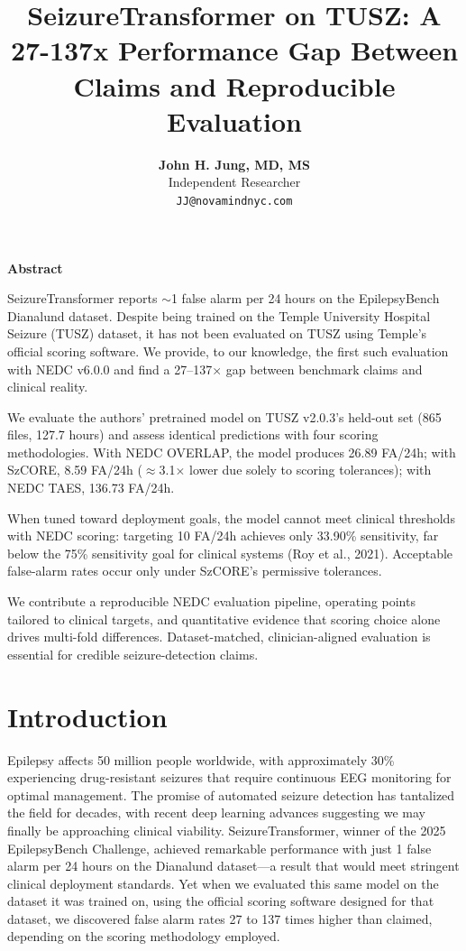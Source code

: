 \documentclass[10pt]{article}
\title{SeizureTransformer on TUSZ: A 27-137x Performance Gap Between\\Claims and Reproducible Evaluation}
\author{
  \textbf{John H. Jung, MD, MS}\\
  Independent Researcher\\
  \texttt{JJ@novamindnyc.com}
}
\date{}  %
\begin{document}
\maketitle

\begin{center}
\textbf{Abstract}
\end{center}

SeizureTransformer reports $\sim$1 false alarm per 24 hours on the EpilepsyBench Dianalund dataset. Despite being trained on the Temple University Hospital Seizure (TUSZ) dataset, it has not been evaluated on TUSZ using Temple's official scoring software. We provide, to our knowledge, the first such evaluation with NEDC v6.0.0 and find a 27--137$\times$ gap between benchmark claims and clinical reality.

We evaluate the authors' pretrained model on TUSZ v2.0.3's held-out set (865 files, 127.7 hours) and assess identical predictions with four scoring methodologies. With NEDC OVERLAP, the model produces 26.89 FA/24h; with SzCORE, 8.59 FA/24h ($\approx$3.1$\times$ lower due solely to scoring tolerances); with NEDC TAES, 136.73 FA/24h.

When tuned toward deployment goals, the model cannot meet clinical thresholds with NEDC scoring: targeting 10 FA/24h achieves only 33.90\% sensitivity, far below the 75\% sensitivity goal for clinical systems (Roy et al., 2021). Acceptable false-alarm rates occur only under SzCORE's permissive tolerances.

We contribute a reproducible NEDC evaluation pipeline, operating points tailored to clinical targets, and quantitative evidence that scoring choice alone drives multi-fold differences. Dataset-matched, clinician-aligned evaluation is essential for credible seizure-detection claims.

\section{Introduction}

Epilepsy affects 50 million people worldwide, with approximately 30\% experiencing drug-resistant seizures that require continuous EEG monitoring for optimal management. The promise of automated seizure detection has tantalized the field for decades, with recent deep learning advances suggesting we may finally be approaching clinical viability. SeizureTransformer, winner of the 2025 EpilepsyBench Challenge, achieved remarkable performance with just 1 false alarm per 24 hours on the Dianalund dataset—a result that would meet stringent clinical deployment standards. Yet when we evaluated this same model on the dataset it was trained on, using the official scoring software designed for that dataset, we discovered false alarm rates 27 to 137 times higher than claimed, depending on the scoring methodology employed.
\end{document}
